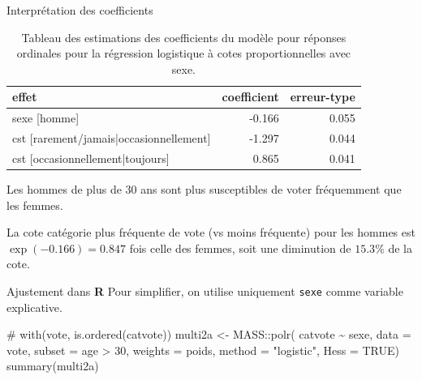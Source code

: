 \documentclass[
  ignorenonframetext,
]{beamer}
\newenvironment{Shaded}{\begin{snugshade}}{\end{snugshade}}
\newcommand{\AttributeTok}[1]{\textcolor[rgb]{0.40,0.45,0.13}{#1}}
\newcommand{\CommentTok}[1]{\textcolor[rgb]{0.37,0.37,0.37}{#1}}
\newcommand{\ConstantTok}[1]{\textcolor[rgb]{0.56,0.35,0.01}{#1}}
\newcommand{\DecValTok}[1]{\textcolor[rgb]{0.68,0.00,0.00}{#1}}
\newcommand{\FunctionTok}[1]{\textcolor[rgb]{0.28,0.35,0.67}{#1}}
\newcommand{\NormalTok}[1]{\textcolor[rgb]{0.00,0.23,0.31}{#1}}
\newcommand{\OtherTok}[1]{\textcolor[rgb]{0.00,0.23,0.31}{#1}}
\newcommand{\SpecialCharTok}[1]{\textcolor[rgb]{0.37,0.37,0.37}{#1}}
\newcommand{\StringTok}[1]{\textcolor[rgb]{0.13,0.47,0.30}{#1}}
\begin{document}
\begin{frame}{Interprétation des coefficients}
\protect\hypertarget{interpruxe9tation-des-coefficients}{}
\hypertarget{tbl-ordered-logistic}{}
\begin{table}
\caption{\label{tbl-ordered-logistic}Tableau des estimations des coefficients du modèle pour réponses
ordinales pour la régression logistique à cotes proportionnelles avec
sexe. }\tabularnewline

\centering
\begin{tabular}[t]{lrr}
\toprule
effet & coefficient & erreur-type\\
\midrule
sexe [homme] & -0.166 & 0.055\\
cst [rarement/jamais|occasionnellement] & -1.297 & 0.044\\
cst [occasionnellement|toujours] & 0.865 & 0.041\\
\bottomrule
\end{tabular}
\end{table}

Les hommes de plus de 30 ans sont plus susceptibles de voter fréquemment
que les femmes.

La cote catégorie plus fréquente de vote (vs moins fréquente) pour les
hommes est \(\exp(-0.166)=0.847\) fois celle des femmes, soit une
diminution de \(15.3\%\) de la cote.
\end{frame}

\begin{frame}[fragile]{Ajustement dans \textbf{R}}
\protect\hypertarget{ajustement-dans-r}{}
Pour simplifier, on utilise uniquement \texttt{sexe} comme variable
explicative.

\begin{Shaded}
\begin{Highlighting}[numbers=left,,]
\CommentTok{\# with(vote, is.ordered(catvote))}
\NormalTok{multi2a }\OtherTok{\textless{}{-}}\NormalTok{ MASS}\SpecialCharTok{::}\FunctionTok{polr}\NormalTok{(}
\NormalTok{  catvote }\SpecialCharTok{\textasciitilde{}}\NormalTok{ sexe, }
  \AttributeTok{data =}\NormalTok{ vote, }
  \AttributeTok{subset =}\NormalTok{ age }\SpecialCharTok{\textgreater{}} \DecValTok{30}\NormalTok{,}
  \AttributeTok{weights =}\NormalTok{ poids,}
  \AttributeTok{method =} \StringTok{"logistic"}\NormalTok{, }
  \AttributeTok{Hess =} \ConstantTok{TRUE}\NormalTok{)}
\FunctionTok{summary}\NormalTok{(multi2a)}
\end{Highlighting}
\end{Shaded}
\end{frame}
\end{document}
